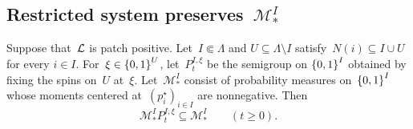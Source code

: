 \subsection{Restricted system preserves~$\mathcal{M}_*^I$}
\label{app:boundary-moment-preservation}

\begin{lemma}
\label{lem:boundary-moment-preservation}
Suppose that~$\mathcal{L}$ is patch positive. Let~$I\Subset\Lambda$ and
$U\subseteq\Lambda\setminus I$ satisfy~$N(i)\subseteq I\cup U$ for every
$i\in I$. For~$\xi\in\left\{0,1\right\}^U$, let~$P_t^{I,\xi}$ be the semigroup on
$\left\{0,1\right\}^I$ obtained by fixing the spins on~$U$ at~$\xi$.
Let~$\mathcal M_*^I$ consist of probability measures on~$\left\{0,1\right\}^I$
whose moments centered at~$(p_i^\star)_{i\in I}$ are
nonnegative. Then
\begin{equation*}
\mathcal M_*^I P_t^{I,\xi}\subseteq\mathcal M_*^I
\qquad(t\geq0).
\end{equation*}
\end{lemma}

